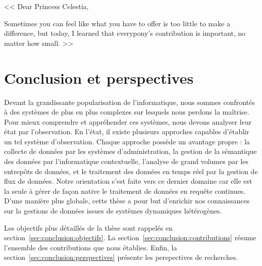 \begin{savequote}[.5\textwidth]
<< Dear Princess Celestia,

\quad Sometimes you can feel like what you have to offer is too little to make a difference, but today, I learned that everypony's contribution is important, no matter how small. >>
\end{savequote}

\chapter{Conclusion et perspectives}\label{chap:conclusion}
\chaptertoc

Devant la grandissante popularisation de l'informatique, nous sommes confrontés à des systèmes de plus en plus complexes sur lesquels nous perdons la maîtrise. Pour mieux comprendre et appréhender ces systèmes, nous devons analyser leur état par l'observation. En l'état, il existe plusieurs approches capables d'établir un tel système d'observation. Chaque approche possède un avantage propre : la collecte de données par les systèmes d'administration, la gestion de la sémantique des données par l'informatique contextuelle, l'analyse de grand volumes par les entrepôts de données, et le traitement des données en temps réel par la gestion de flux de données. Notre orientation s'est faite vers ce dernier domaine car elle est la seule à gérer de façon native le traitement de données en requête continues. D'une manière plus globale, cette thèse a pour but d'enrichir nos connaissances sur la gestions de données issues de systèmes dynamiques hétérogènes. 

Les objectifs plus détaillés de la thèse sont rappelés en section~\ref{sec:conclusion:objectifs}. La section~\ref{sec:conclusion:contributions} résume l'ensemble des contributions que nous établies. Enfin, la section~\ref{sec:conclusion:perspectives} présente les perspectives de recherches.




